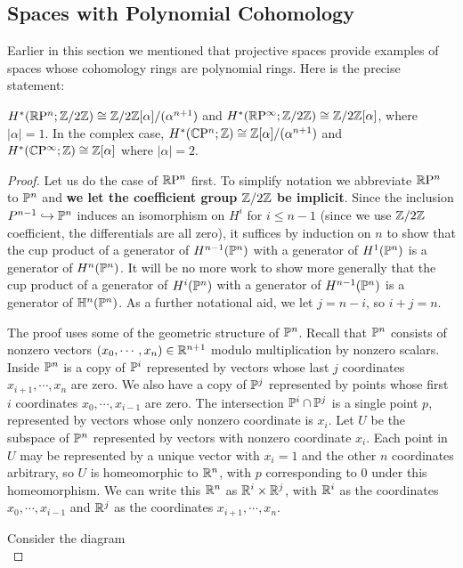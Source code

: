 \subsection{Spaces with Polynomial Cohomology}
Earlier in this section we mentioned that projective spaces provide examples of
spaces whose cohomology rings are polynomial rings. Here is the precise statement:
\begin{theorem}
$H^*(\RP^n;\Z/2\Z)\cong\Z/2\Z[\alpha]/(\alpha^{n+1})$ and $H^*(\RP^{\infty}; \Z/2\Z)\cong\Z/2\Z[\alpha]$, where $|\alpha|=1$. In the complex case, $H^*(\CP^n;\Z)\cong\Z[\alpha]/(\alpha^{n+1})$ and $H^*(\CP^\infty;\Z)\cong\Z[\alpha]$ where $|\alpha|=2$.
\end{theorem}
\begin{proof}
Let us do the case of $\RP^n$ first. To simplify notation we abbreviate $\RP^n$ to $\P^n$ and \textbf{we let the coefficient group $\Z/2\Z$ be implicit}. Since the inclusion $P^{n-1}\hookrightarrow\P^n$ induces an isomorphism on $H^i$ for $i\leq n-1$ (since we use $\Z/2\Z$ coefficient, the differentials are all zero), it suffices by induction on $n$ to show that the cup product of a generator of $H^{n-1}(\P^n)$ with a generator of $H^1(\P^n)$ is a generator of $H^n(\P^n)$. It will be no more work to show more generally that the cup product of a generator of $H^i(\P^n)$ with a generator of $H^{n-1}(\P^n)$ is a generator of $\H^n(\P^n)$. As a further notational aid, we let $j=n-i$, so $i+j=n$.\par
The proof uses some of the geometric structure of $\P^n$. Recall that $\P^n$ consists of nonzero vectors $(x_0,\cdots,x_n)\in\R^{n+1}$ modulo multiplication by nonzero scalars. Inside $\P^n$ is a copy of $\P^i$ represented by vectors whose last $j$ coordinates $x_{i+1},\cdots,x_n$ are zero. We also have a copy of $\P^j$ represented by points whose first $i$ coordinates $x_0,\cdots,x_{i-1}$ are zero. The intersection $\P^i\cap\P^j$ is a single point $p$, represented by vectors whose only nonzero coordinate is $x_i$. Let $U$ be the subspace of $\P^n$ represented by vectors with nonzero coordinate $x_i$. Each point in $U$ may be represented by a unique vector with $x_i=1$ and the other $n$ coordinates arbitrary, so $U$ is homeomorphic to $\R^n$, with $p$ corresponding to $0$ under this homeomorphism. We can write this $\R^n$ as $\R^i\times\R^j$, with $\R^i$ as the coordinates $x_0,\cdots,x_{i-1}$ and $\R^j$ as the coordinates $x_{i+1},\cdots,x_n$.\par
Consider the diagram
\begin{equation}\label{coeff ring-1}

\end{equation}
\end{proof}
